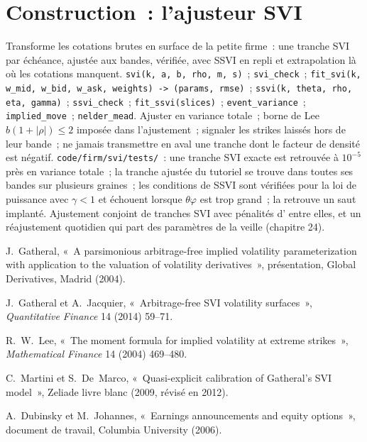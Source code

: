 \section{Construction~: l'ajusteur SVI}\label{bld:dv:parametrising-the-surface:svi}

\begin{build}
 Transforme les cotations brutes en surface de la petite firme~: une tranche SVI par échéance, ajustée aux
bandes, vérifiée, avec SSVI en repli et extrapolation là où les cotations manquent.
 \texttt{svi(k, a, b, rho, m, s)}~; \texttt{svi\_check}~; \texttt{fit\_svi(k, w\_mid,
w\_bid, w\_ask, weights) -> (params, rmse)}~; \texttt{ssvi(k, theta, rho, eta, gamma)}~;
\texttt{ssvi\_check}~; \texttt{fit\_ssvi(slices)}~; \texttt{event\_variance}~; \texttt{implied\_move}~;
\texttt{nelder\_mead}.
 Ajuster en variance totale~; borne de Lee $b(1+|\rho|)\le2$ imposée dans l'ajustement~; signaler les
strikes laissés hors de leur bande~; ne jamais transmettre en aval une tranche dont le facteur de densité est négatif.
 \texttt{code/firm/svi/tests/}~: une tranche SVI exacte est retrouvée à
$10^{-5}$ près en variance totale~; la tranche ajustée du tutoriel se trouve dans toutes ses bandes sur plusieurs
graines~; les conditions de SSVI sont vérifiées pour la loi de puissance avec $\gamma<1$ et échouent lorsque $\theta\varphi$ est
trop grand~; la  retrouve un saut implanté.
 Ajustement conjoint de tranches SVI avec pénalités d' entre elles, et un
réajustement quotidien qui part des paramètres de la veille (chapitre 24).
\end{build}

\begin{omsources}
\item J.~Gatheral, «~A parsimonious arbitrage-free implied volatility parameterization with
application to the valuation of volatility derivatives~», présentation, Global Derivatives, Madrid
(2004).
\item J.~Gatheral et A.~Jacquier, «~Arbitrage-free SVI volatility surfaces~», \emph{Quantitative
Finance} 14 (2014) 59--71.
\item R.~W.~Lee, «~The moment formula for implied volatility at extreme strikes~», \emph{Mathematical
Finance} 14 (2004) 469--480.
\item C.~Martini et S.~De~Marco, «~Quasi-explicit calibration of Gatheral's SVI model~», Zeliade
livre blanc (2009, révisé en 2012).
\item A.~Dubinsky et M.~Johannes, «~Earnings announcements and equity options~», document de travail,
Columbia University (2006).
\end{omsources}

